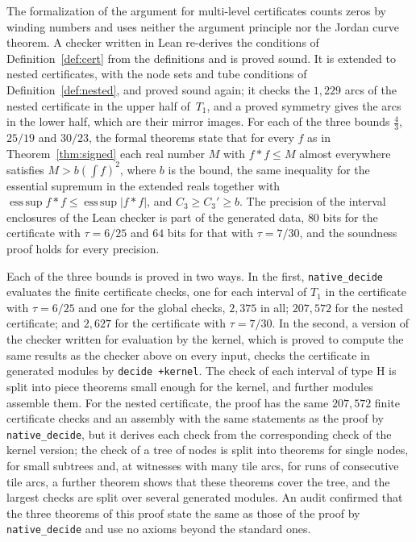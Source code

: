 \documentclass[11pt]{amsart}
\theoremstyle{definition}
\theoremstyle{remark}
\numberwithin{equation}{section}
\newcommand{\esssup}{\operatorname*{ess\,sup}}
\newcommand{\CthrPFrac}{\tfrac43}
\newcommand{\LeanSigSlash}{25/19}
\newcommand{\LeanSChecks}{2{,}375}
\newcommand{\LeanQChecks}{207{,}572}
\begin{document}
The formalization of the argument for multi-level certificates counts zeros by winding numbers and uses neither the argument principle nor the Jordan curve theorem. A checker written in Lean re-derives the conditions of Definition~\ref{def:cert} from the definitions and is proved sound. It is extended to nested certificates, with the node sets and tube conditions of Definition~\ref{def:nested}, and proved sound again; it checks the $1{,}229$ arcs of the nested certificate in the upper half of~$T_1$, and a proved symmetry gives the arcs in the lower half, which are their mirror images. For each of the three bounds $\CthrPFrac$, $\LeanSigSlash$ and $30/23$, the formal theorems state that for every $f$ as in Theorem~\ref{thm:signed} each real number $M$ with $f*f\le M$ almost everywhere satisfies $M>b(\int f)^2$, where $b$ is the bound, the same inequality for the essential supremum in the extended reals together with $\esssup f*f\le\esssup|f*f|$, and $C_3\ge C_3'\ge b$. The precision of the interval enclosures of the Lean checker is part of the generated data, $80$ bits for the certificate with $\tau=6/25$ and $64$ bits for that with $\tau=7/30$, and the soundness proof holds for every precision.

Each of the three bounds is proved in two ways. In the first, \texttt{native\_decide} evaluates the finite certificate checks, one for each interval of $T_1$ in the certificate with $\tau=6/25$ and one for the global checks, $\LeanSChecks$ in all; $\LeanQChecks$ for the nested certificate; and $2{,}627$ for the certificate with $\tau=7/30$. In the second, a version of the checker written for evaluation by the kernel, which is proved to compute the same results as the checker above on every input, checks the certificate in generated modules by \texttt{decide +kernel}. The check of each interval of type H is split into piece theorems small enough for the kernel, and further modules assemble them. For the nested certificate, the proof has the same $\LeanQChecks$ finite certificate checks and an assembly with the same statements as the proof by \texttt{native\_decide}, but it derives each check from the corresponding check of the kernel version; the check of a tree of nodes is split into theorems for single nodes, for small subtrees and, at witnesses with many tile arcs, for runs of consecutive tile arcs, a further theorem shows that these theorems cover the tree, and the largest checks are split over several generated modules. An audit confirmed that the three theorems of this proof state the same as those of the proof by \texttt{native\_decide} and use no axioms beyond the standard ones.
\end{document}

